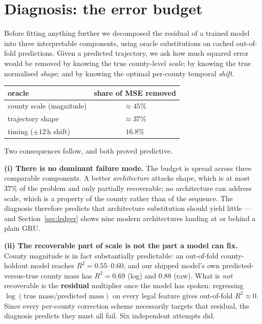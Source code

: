 \documentclass[10pt,letterpaper,twocolumn]{article}
\begin{document}
\section{Diagnosis: the error budget}
\label{sec:diag}

Before fitting anything further we decomposed the residual of a trained model
into three interpretable components, using oracle substitutions on cached
out-of-fold predictions. Given a predicted trajectory, we ask how much squared
error would be removed by knowing the true county-level \emph{scale}; by knowing
the true normalised \emph{shape}; and by knowing the optimal per-county temporal
\emph{shift}.

\begin{center}\small
\begin{tabular}{lc}
\toprule
oracle & share of MSE removed \\
\midrule
county scale (magnitude) & $\approx45\%$ \\
trajectory shape & $\approx37\%$ \\
timing ($\pm12$\,h shift) & $16.8\%$ \\
\bottomrule
\end{tabular}
\end{center}

Two consequences follow, and both proved predictive.

\textbf{(i) There is no dominant failure mode.} The budget is spread across three
comparable components. A better \emph{architecture} attacks shape, which is at
most $37\%$ of the problem and only partially recoverable; no architecture can
address scale, which is a property of the county rather than of the sequence.
The diagnosis therefore predicts that architecture substitution should yield
little --- and Section~\ref{sec:ledger} shows nine modern architectures landing
at or behind a plain GRU.

\textbf{(ii) The recoverable part of scale is not the part a model can fix.}
County magnitude is in fact substantially predictable: an out-of-fold
county-holdout model reaches $R^2 = 0.55$--$0.60$, and our shipped model's own
predicted-versus-true county mass has $R^2 = 0.69$ (log) and $0.88$ (raw). What
is \emph{not} recoverable is the \textbf{residual} multiplier once the model has
spoken: regressing $\log(\text{true mass}/\text{predicted mass})$ on every legal
feature gives out-of-fold $R^2 \approx 0$. Since every per-county correction
scheme necessarily targets that residual, the diagnosis predicts they must all
fail. Six independent attempts did.
\end{document}
